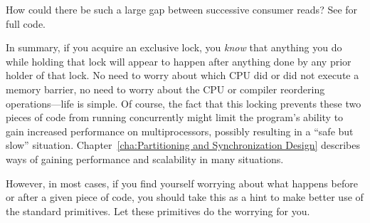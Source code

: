 \QuickQuiz{}
	How could there be such a large gap between successive
	consumer reads?
	See  for full code.
 \QuickQuizEnd

In summary, if you acquire an exclusive lock, you {\em know} that
anything you do while holding that lock will appear to happen after
anything done by any prior holder of that lock.
No need to worry about which CPU did or did not execute a memory
barrier, no need to worry about the CPU or compiler reordering
operations---life is simple.
Of course, the fact that this locking prevents these two pieces of
code from running concurrently might limit the program's ability
to gain increased performance on multiprocessors, possibly resulting
in a ``safe but slow'' situation.
Chapter~\ref{cha:Partitioning and Synchronization Design} describes ways of
gaining performance and scalability in many situations.

However, in most cases, if you find yourself worrying about what happens
before or after a given piece of code, you should take this as a hint to
make better use of the standard primitives.
Let these primitives do the worrying for you.

